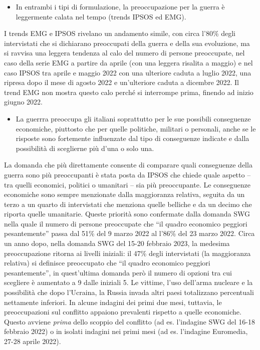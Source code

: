 \documentclass[
  openany]{book}
\providecommand{\tightlist}{%
  \setlength{\itemsep}{0pt}\setlength{\parskip}{0pt}}
\begin{document}
\begin{itemize}
\tightlist
\item
  In entrambi i tipi di formulazione, la preoccupazione per la guerra è leggermente calata nel tempo (trends IPSOS ed EMG).
\end{itemize}

I trends EMG e IPSOS rivelano un andamento simile, con circa l'80\% degli intervistati che si dichiarano preoccupati della guerra e della sua evoluzione, ma si ravvisa una leggera tendenza al calo del numero di persone preoccupate, nel caso della serie EMG a partire da aprile (con una leggera risalita a maggio) e nel caso IPSOS tra aprile e maggio 2022 con una ulteriore caduta a luglio 2022, una ripresa dopo il mese di agosto 2022 e un'ulteriore caduta a dicembre 2022. Il trend EMG non mostra questo calo perché si interrompe prima, finendo ad inizio giugno 2022.

\begin{itemize}
\tightlist
\item
  La guerrra preoccupa gli italiani soprattutto per le sue possibili conseguenze economiche, piuttosto che per quelle politiche, militari o personali, anche se le risposte sono fortemente influenzate dal tipo di conseguenze indicate e dalla possibilità di sceglierne più d'una o solo una.
\end{itemize}

La domanda che più direttamente consente di comparare quali conseguenze della guerra sono più preoccupanti è stata posta da IPSOS che chiede quale aspetto -- tra quelli economici, politici o umanitari -- sia più preoccupante. Le conseguenze economiche sono sempre menzionate dalla maggioranza relativa, seguita da un terzo a un quarto di intervistati che menziona quelle belliche e da un decimo che riporta quelle umanitarie. Queste priorità sono confermate dalla domanda SWG nella quale il numero di persone preoccupate che ``il quadro economico peggiori pesantemente'' passa dal 51\% del 9 marzo 2022 al l'86\% del 23 marzo 2022. Circa un anno dopo, nella domanda SWG del 15-20 febbraio 2023, la medesima preoccupazione ritorna ai livelli iniziali: il 47\% degli intervistati (la maggioranza relativa) si definisce preoccupato che ``il quadro economico peggiori pesantemente'', in quest'ultima domanda però il numero di opzioni tra cui scegliere è aumentato a 9 dalle iniziali 5. Le vittime, l'uso dell'arma nucleare e la possibilità che dopo l'Ucraina, la Russia invada altri paesi totalizzano percentuali nettamente inferiori. In alcune indagini dei primi due mesi, tuttavia, le preoccupazioni sul conflitto appaiono prevalenti rispetto a quelle economiche. Questo avviene \emph{prima} dello scoppio del conflitto (ad es. l'indagine SWG del 16-18 febbraio 2022) o in isolati indagini nei primi mesi (ad es. l'indagine Euromedia, 27-28 aprile 2022).
\end{document}
